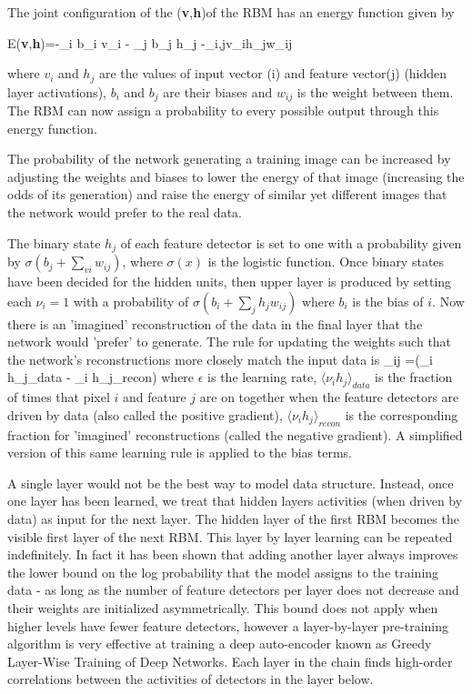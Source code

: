 The joint configuration of the (\textbf{v},\textbf{h})of the RBM has an energy function\citep{hinton2006reducing} given by

\be
E(\textbf{v},\textbf{h})=-\sum_i b_i v_i - \sum_j b_j h_j -\sum_{i,j}v_ih_jw_{ij}
\ee

where $v_i$ and $h_j$ are the values of input vector (i) and feature vector(j) (hidden layer activations), $b_i$ and $b_j$ are their biases and $w_{ij}$ is the weight between them.
The RBM can now assign a probability to every possible output through this energy function.

The probability of the network generating a training image can be increased by adjusting the weights and biases to lower the energy of that image (increasing the odds of its generation) and raise the energy of similar yet different images that the network would prefer to the real data\citep{hinton2006reducing}.


The binary state $h_j$ of each feature detector is set to one with a probability given by $\sigma (b_j+\sum_{vi} w_{ij})$, where $\sigma(x)$ is the logistic function.
Once binary states have been decided for the hidden units, then upper layer is produced by setting each $\nu_i=1$ with a  probability of $\sigma (b_i+\sum_j h_j w_{ij})$ where $b_i$ is the bias of $i$.
Now there is an 'imagined' reconstruction of the data in the final layer that the network would 'prefer' to generate.
The rule for updating the weights such that the network's reconstructions more closely match the input data is\citep{hinton2006reducing}
\be
\Delta \omega_{ij} =\epsilon (\langle\nu_i h_j\rangle_{data} - \langle\nu_i h_j\rangle_{recon})
\ee
where $\epsilon$ is the learning rate, $\langle \nu_i h_j\rangle_{data}$ is the fraction of times that pixel $i$ and feature $j$ are on together when the feature detectors are driven by data (also called the positive gradient), $\langle \nu_i h_j \rangle_{recon}$ is the corresponding fraction for 'imagined' reconstructions (called the negative gradient).
A simplified version of this same learning rule is applied to the bias terms.


A single layer would not be the best way to model data structure.
Instead, once one layer has been learned, we treat that hidden layers activities (when driven by data) as input for the next layer.
The hidden layer of the first RBM becomes the visible first layer of the next RBM\citep{hinton2006reducing}.
This layer by layer learning can be repeated indefinitely.
In fact it has been shown that adding another layer always improves the lower bound on the log probability that the model assigns to the training data - as long as the number of feature detectors per layer does not decrease and their weights are initialized asymmetrically\citep{hinton2006reducing}.
This bound does not apply when higher levels have fewer feature detectors, however a layer-by-layer pre-training algorithm is very effective at training a deep auto-encoder known as Greedy Layer-Wise Training of Deep Networks\citep{bengio2007greedy}.
Each layer in the chain finds high-order correlations between the activities of detectors in the layer below.

